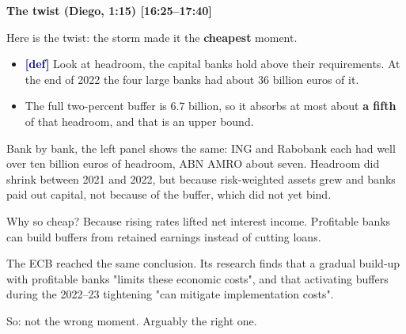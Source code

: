 {\small\textbf{The twist (Diego, 1:15) [16:25–17:40]}}\par\smallskip
Here is the twist: the storm made it the \textbf{cheapest} moment.
\begin{itemize}\setlength\itemsep{0pt}
\item \textcolor{navy}{\textbf{[def]}} Look at headroom, the capital banks hold above their requirements. At the end of 2022 the four large banks had about 36 billion euros of it.
\item The full two-percent buffer is 6.7 billion, so it absorbs at most about \textbf{a fifth} of that headroom, and that is an upper bound.
\end{itemize}
\par\smallskip
Bank by bank, the left panel shows the same: ING and Rabobank each had well over ten billion euros of headroom, ABN AMRO about seven. Headroom did shrink between 2021 and 2022, but because risk-weighted assets grew and banks paid out capital, not because of the buffer, which did not yet bind.
\par\smallskip
Why so cheap? Because rising rates lifted net interest income. Profitable banks can build buffers from retained earnings instead of cutting loans.
\par\smallskip
The ECB reached the same conclusion. Its research finds that a gradual build-up with profitable banks "limits these economic costs", and that activating buffers during the 2022–23 tightening "can mitigate implementation costs".
\par\smallskip
So: not the wrong moment. Arguably the right one.

